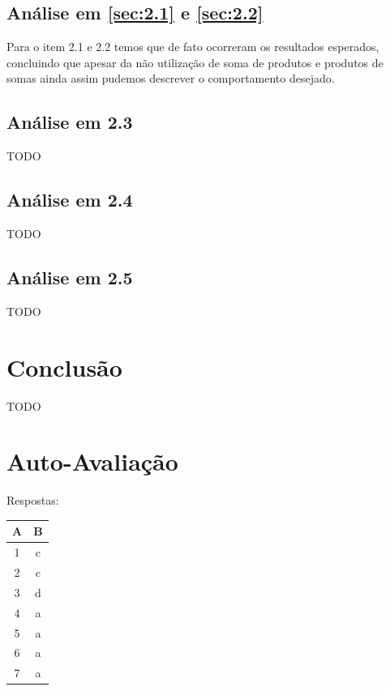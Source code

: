\documentclass[12pt]{article}
\begin{document}
\subsection{Análise em \ref{sec:2.1} e \ref{sec:2.2}}\label{sec:analise2.1}

Para o item 2.1 e 2.2 temos que de fato ocorreram os resultados esperados,
concluindo que apesar da não utilização de soma de produtos e produtos de somas
ainda assim pudemos descrever o comportamento desejado.

\subsection{Análise em 2.3}\label{sec:analise2.2}
TODO

\subsection{Análise em 2.4}\label{sec:analise2.2}
TODO

\subsection{Análise em 2.5}\label{sec:analise2.2}
TODO

\section{Conclusão}
\label{sec:Conclusao}

TODO

\nocite{*}



\newpage
\section*{Auto-Avaliação}

Respostas:

\begin{table}[H]
      \begin{tabular}{|c|c|} \hline
      \textbf{A} & \textbf{B}\\
      \hline
      1 & c \\ \hline
      2 & c \\ \hline
      3 & d \\ \hline
      4 & a \\ \hline
      5 & a \\ \hline
      6 & a \\ \hline
      7 & a \\ \hline
      \end{tabular}
\end{table}
\end{document}
